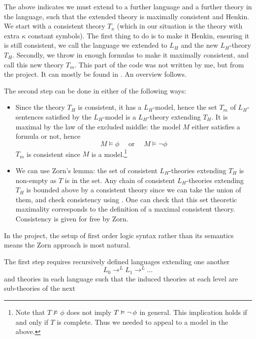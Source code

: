 
The above indicates we must extend to a further language and a further theory
in the language, such that the extended theory is maximally consistent and Henkin.
We start with a consistent theory $T_{\kappa}$
(which in our situation is the theory with extra $\kappa$ constant symbols).
The first thing to do is to make it Henkin, ensuring it is still consistent,
we call the language we extended to $L_{H}$ and the new $L_{H}$-theory $T_{H}$.
Secondly, we throw in enough formulas to make it maximally consistent,
and call this new theory $T_{m}$.
This part of the code was not written by me, but from the  project.
It can mostly be found in . An overview follows.

The second step can be done in either of the following ways:
\begin{itemize}
  \item Since the theory $T_{H}$ is consistent, it has a $L_{H}$-model,
        hence the set $T_{m}$ of $L_{H}$-sentences satisfied by the $L_{H}$-model is a
        $L_{H}$-theory extending $T_{H}$.
        It is maximal by the law of the excluded middle:
        the model $M$ either satisfies a formula or not,
        hence
        \[ M \vDash \phi \quad \text{ or } \quad M \vDash \neg \phi \]
        $T_{m}$ is consistent since $M$ is a model.\footnote{Note that
          $T \nvDash \phi$ does not imply $T \vDash \neg\, \phi$ in general.
          This implication holds if and only if $T$ is complete.
          Thus we needed to appeal to a model in the above.}
  \item We can use Zorn's lemma: the set of consistent $L_{H}$-theories extending
        $T_{H}$ is non-empty as $T$ is in the set.
        Any chain of consistent $L_{H}$-theories extending $T_{H}$ is bounded
        above by a consistent theory since we can take the union of them,
        and check consistency using .
        One can check that this set theoretic maximality corresponds to
        the definition of a maximal consistent theory.
        Consistency is given for free by Zorn.
\end{itemize}
In the  project, the setup of first order logic
syntax rather than its semantics means the Zorn approach is most natural.

The first step requires recursively defined languages extending one another
\[ L_{0} \to^{L} L_{1} \to^{L} \dots \]
and theories in each language such that the induced theories
at each level are sub-theories of the next

